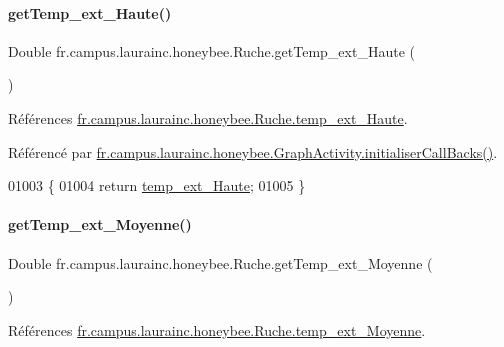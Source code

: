 \paragraph{\texorpdfstring{get\+Temp\+\_\+ext\+\_\+\+Haute()}{getTemp\_ext\_Haute()}}
{\footnotesize\ttfamily Double fr.\+campus.\+laurainc.\+honeybee.\+Ruche.\+get\+Temp\+\_\+ext\+\_\+\+Haute (\begin{DoxyParamCaption}{ }\end{DoxyParamCaption})}



Références \hyperlink{classfr_1_1campus_1_1laurainc_1_1honeybee_1_1_ruche_aa5737d305533c90c63a57fb567ed7eb4}{fr.\+campus.\+laurainc.\+honeybee.\+Ruche.\+temp\+\_\+ext\+\_\+\+Haute}.



Référencé par \hyperlink{classfr_1_1campus_1_1laurainc_1_1honeybee_1_1_graph_activity_a8dc56c3e0744bcb9295ad10e726b5fdb}{fr.\+campus.\+laurainc.\+honeybee.\+Graph\+Activity.\+initialiser\+Call\+Backs()}.


\begin{DoxyCode}
01003                                       \{
01004         \textcolor{keywordflow}{return} \hyperlink{classfr_1_1campus_1_1laurainc_1_1honeybee_1_1_ruche_aa5737d305533c90c63a57fb567ed7eb4}{temp\_ext\_Haute};
01005     \}
\end{DoxyCode}
\mbox{\label{classfr_1_1campus_1_1laurainc_1_1honeybee_1_1_ruche_ae0d031ea6a9f44b45c3ffb97a066904c}} 
\paragraph{\texorpdfstring{get\+Temp\+\_\+ext\+\_\+\+Moyenne()}{getTemp\_ext\_Moyenne()}}
{\footnotesize\ttfamily Double fr.\+campus.\+laurainc.\+honeybee.\+Ruche.\+get\+Temp\+\_\+ext\+\_\+\+Moyenne (\begin{DoxyParamCaption}{ }\end{DoxyParamCaption})}



Références \hyperlink{classfr_1_1campus_1_1laurainc_1_1honeybee_1_1_ruche_a254c5bb0927e07aebb85c811560eff98}{fr.\+campus.\+laurainc.\+honeybee.\+Ruche.\+temp\+\_\+ext\+\_\+\+Moyenne}.




